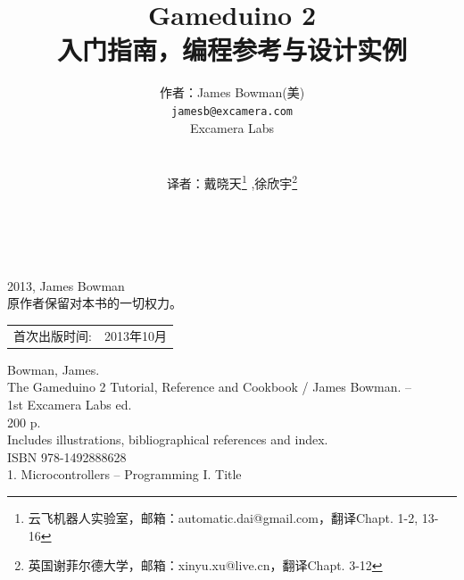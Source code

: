 \documentclass[10pt]{book}
\title{\LARGE \bf
Gameduino 2\\
入门指南，编程参考与设计实例
}
\author{作者：James Bowman(美) \\
	{\tt\small jamesb@excamera.com} \\
  Excamera Labs\\
   \\
   \\
  译者：戴晓天\footnote{云飞机器人实验室，邮箱：automatic.dai@gmail.com，翻译Chapt. 1-2, 13-16}
  ,徐欣宇\footnote{英国谢菲尔德大学，邮箱：xinyu.xu@live.cn，翻译Chapt. 3-12}\\
  \\
  \\  
}
\date{}
\begin{document}
\begin{CJK}{UTF8}{gkai}
\maketitle

\begingroup
\footnotesize
\parindent 0pt
\parskip \baselineskip
\textcopyright{} 2013, James Bowman \\
原作者保留对本书的一切权力。

% 
% 
% 
% 

\begin{center}
\begin{tabular}{ll}
首次出版时间:  & 2013年10月 \\
\end{tabular}
\end{center}

\vfill

Bowman, James.\\
\hspace*{2em} The Gameduino 2 Tutorial, Reference and Cookbook / James Bowman. -- \\
\hspace*{1em} 1st Excamera Labs ed. \\
\hspace*{2em} 200 p. \hspace*{2em} \\
\hspace*{2em} Includes illustrations, bibliographical references and index. \\
\hspace*{2em} ISBN 978-1492888628 \\
\hspace*{2em} 1. Microcontrollers -- Programming \hspace*{2em} I. Title



\end{CJK}
\end{document}
